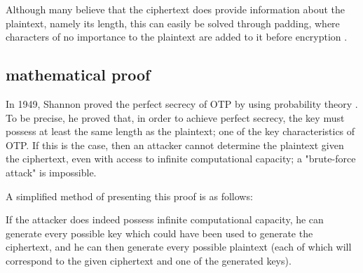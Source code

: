 \documentclass[12pt]{report}
\begin{document}
Although many believe that the ciphertext does provide information about the plaintext, namely its length, this can easily be solved through padding, where characters of no importance to the plaintext are added to it before encryption \cite{HutSix}.

\subsection{mathematical proof}



In 1949, Shannon proved the perfect secrecy of OTP by using probability theory \cite{ShannonOTP}. To be precise, he proved that, in order to achieve perfect secrecy, the key must possess at least the same length as the plaintext; one of the key characteristics of OTP. If this is the case, then an attacker cannot determine the plaintext given the ciphertext, even with access to infinite computational capacity; a "brute-force attack" is impossible.



A simplified method of presenting this proof is as follows:

If the attacker does indeed possess infinite computational capacity, he can generate every possible key which could have been used to generate the ciphertext, and he can then generate every possible plaintext (each of which will correspond to the given ciphertext and one of the generated keys).

\end{document}
